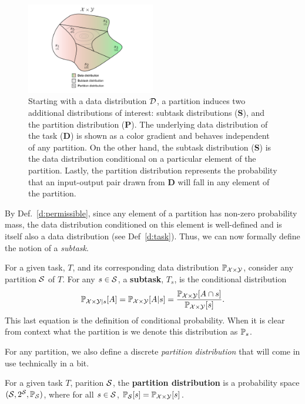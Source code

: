 \begin{figure}[h!]
\centering
\includegraphics[width=0.5\textwidth]{figs/permissible-partition.pdf}
\caption{Starting with a data distribution $\cD$, a partition
induces two additional distributions of interest: subtask distributions
(\textbf{S}), and the partition distribution (\textbf{P}). 
The underlying data
distribution of the task (\textbf{D}) is shown as a color gradient
and behaves independent of any partition. 
On the other hand, the subtask
distribution (\textbf{S}) is the data distribution conditional 
on a particular
element of the partition. Lastly, the partition distribution 
represents the probability that an input-output pair drawn from
\textbf{D} will fall in any element of the partition.}
\label{f:permissible-partition-induced-distributions}
\end{figure}
By Def.~\ref{d:permissible}, since any element of a partition
has non-zero probability mass, the data distribution conditioned on this
element is well-defined and is itself also a data distribution 
(see Def~\ref{d:task}). Thus, we can now formally define the notion
of a \textit{subtask}.
\begin{defn}[Subtask]
For a given task, $T$, and its corresponding data distribution 
$\P_{\cX\times\cY}$, consider any partition $\cS$ of $T$.
For any $s \in \cS$, a \textbf{subtask}, $T_s$, is the conditional
distribution
\[
\P_{\cX\times \cY | s}[A] = \P_{\cX\times \cY}[A | s]
= \frac{\P_{\cX\times\cY}[A \cap s]}{\P_{\cX \times \cY}[s]}.
\]
This last equation is the definition of conditional probability.
When it is clear from context what the partition is 
we denote this distribution as $\P_s$.
\end{defn}
For any partition, we also define a discrete \textit{partition distribution}
that will come in use technically in a bit. 
\begin{defn}\label{d:partition-distribution}
For a given task $T$, parition $\cS$, the \textbf{partition distribution}
is a probability space $(\cS, 2^{\cS}, \P_\cS)$, where for all $s \in \cS$,
$\P_\cS[s] = \P_{\cX\times\cY}[s]$.
\end{defn}

